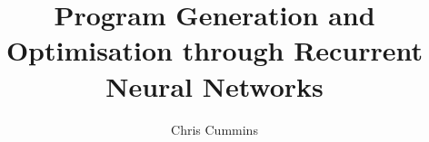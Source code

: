 

\title{Program Generation and Optimisation through Recurrent Neural Networks}
\author{Chris Cummins}

\abstract{}

\newif\ifstapled


  
  
  
  
  
  
  
  
  
